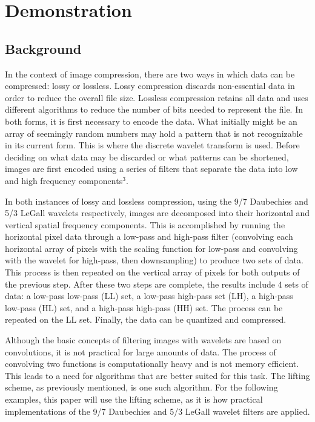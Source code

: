 \documentclass{article}
\begin{document}
\section{Demonstration}
\subsection{Background}
In the context of image compression, there are two ways in which data can be compressed: lossy or lossless. Lossy compression discards non-essential data in order to reduce the overall file size. Lossless compression retains all data and uses different algorithms to reduce the number of bits needed to represent the file. In both forms, it is first necessary to encode the data. What initially might be an array of seemingly random numbers may hold a pattern that is not recognizable in its current form. This is where the discrete wavelet transform is used. Before deciding on what data may be discarded or what patterns can be shortened, images are first encoded using a series of filters that separate the data into low and high frequency components$^3$. 

In both instances of lossy and lossless compression, using the 9/7 Daubechies and 5/3 LeGall wavelets respectively, images are decomposed into their horizontal and vertical spatial frequency components. This is accomplished by running the horizontal pixel data through a low-pass and high-pass filter (convolving each horizontal array of pixels with the scaling function for low-pass and convolving with the wavelet for high-pass, then downsampling) to produce two sets of data. This process is then repeated on the vertical array of pixels for both outputs of the previous step\cite{book}. After these two steps are complete, the results include 4 sets of data: a low-pass low-pass (LL) set, a low-pass high-pass set (LH), a high-pass low-pass (HL) set, and a high-pass high-pass (HH) set. The process can be repeated on the LL set. Finally, the data can be quantized and compressed. 

Although the basic concepts of filtering images with wavelets are based on convolutions, it is not practical for large amounts of data. The process of convolving two functions is computationally heavy and is not memory efficient. This leads to a need for algorithms that are better suited for this task. The lifting scheme, as previously mentioned, is one such algorithm. For the following examples, this paper will use the lifting scheme, as it is how practical implementations of the 9/7 Daubechies and 5/3 LeGall wavelet filters are applied. 
\end{document}
